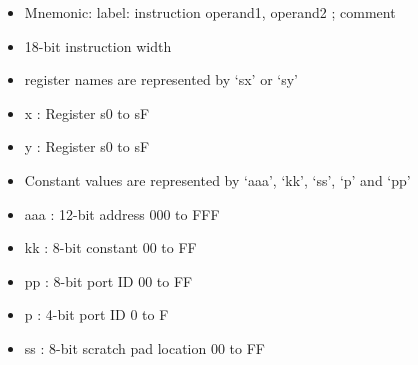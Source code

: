 \documentclass[bibliography=totoc,listof=totoc,index=totoc]{scrartcl}
\begin{document}
\begin{itemize}
    \item Mnemonic: label: instruction operand1, operand2 ; comment
    \item 18-bit instruction width
    \item register names are represented by ‘sx’ or ‘sy’
    \item x : Register s0 to sF
    \item y : Register s0 to sF
    \item Constant values are represented by ‘aaa’, ‘kk’, ‘ss’, ‘p’ and ‘pp’
    \item aaa : 12-bit address 000 to FFF
    \item kk : 8-bit constant 00 to FF
    \item pp : 8-bit port ID 00 to FF
    \item p : 4-bit port ID 0 to F
    \item ss : 8-bit scratch pad location 00 to FF
\end{itemize}
\end{document}
